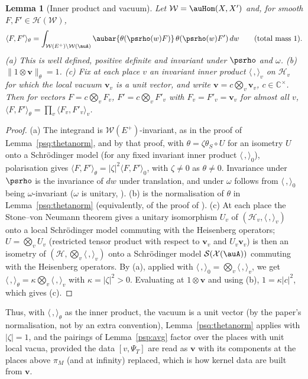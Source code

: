 \documentclass[10pt]{amsart}
\newtheorem{lemma}[theorem]{Lemma}
\theoremstyle{definition}
\theoremstyle{remark}
\newcommand{\C}{\mathbb C}
\providecommand{\psHS}{\mathcal H}
\providecommand{\psvac}{\mathbf v}
\begin{document}
\begin{lemma}[Inner product and vacuum]\label{psq:unitvac}
Let $\mathcal W=\auHom(X,X')$ and, for smooth $F,F'\in\psHS(\mathcal W)$,
\[
\langle F,F'\rangle_\theta=\int_{\mathcal W(E^+)\backslash\mathcal W(\auA)}\aubar{\theta(\psrho(w)F)}\,
\theta(\psrho(w)F')\,dw\qquad(\text{total mass }1).
\]
\textup{(a)} This is well defined, positive definite and invariant under $\psrho$ and $\omega$.
\textup{(b)} $\|1\otimes\psvac\|_\theta=1$. \textup{(c)} Fix at each place $v$ an invariant inner
product $\langle\,,\rangle_v$ on $\psHS_v$ for which the local vacuum $\psvac_v$ is a unit vector, and
write $\psvac=c\bigotimes_v\psvac_v$, $c\in\C^\times$. Then for vectors $F=c\bigotimes_vF_v$,
$F'=c\bigotimes_vF'_v$ with $F_v=F'_v=\psvac_v$ for almost all $v$,
$\langle F,F'\rangle_\theta=\prod_v\langle F_v,F'_v\rangle_v$.
\end{lemma}
\begin{proof}
(a) The integrand is $\mathcal W(E^+)$-invariant, as in the proof of Lemma~\ref{psq:thetanorm}, and by
that proof, with $\theta=\zeta\theta_S\circ U$ for an isometry $U$ onto a Schr\"odinger model (for any
fixed invariant inner product $\langle\,,\rangle_0$), polarisation gives $\langle F,F'\rangle_\theta=
|\zeta|^2\langle F,F'\rangle_0$, with $\zeta\ne0$ as $\theta\ne0$. Invariance under $\psrho$ is the
invariance of $dw$ under translation, and under $\omega$ follows from $\langle\,,\rangle_0$ being
$\omega$-invariant ($\omega$ is unitary, {\cite[Lemma~5.2]{P49}}). (b) is the normalisation of $\theta$ in Lemma~\ref{psq:thetanorm} (equivalently, of the proof of
{\cite[Proposition~5.27(ii)]{P49}}). (c) At each place the Stone--von Neumann theorem gives a unitary
isomorphism $U_v$ of $(\psHS_v,\langle\,,\rangle_v)$ onto a local Schr\"odinger model commuting with
the Heisenberg operators; $U=\bigotimes_vU_v$ (restricted tensor product with respect to $\psvac_v$ and
$U_v\psvac_v$) is then an isometry of $(\psHS,\bigotimes_v\langle\,,\rangle_v)$ onto a Schr\"odinger
model $\mathcal S(\mathcal X(\auA))$ commuting with the Heisenberg operators. By (a), applied with
$\langle\,,\rangle_0=\bigotimes_v\langle\,,\rangle_v$, we get $\langle\,,\rangle_\theta=\kappa\bigotimes_v
\langle\,,\rangle_v$ with $\kappa=|\zeta|^2>0$. Evaluating at $1\otimes\psvac$ and using (b), $1=\kappa|c|^2$, which gives (c).
\end{proof}

\noindent Thus, with $\langle\,,\rangle_\theta$ as the inner product, the vacuum is a unit vector (by
the paper's normalisation, not by an extra convention), Lemma~\ref{psq:thetanorm} applies with
$|\zeta|=1$, and the pairings of Lemma~\ref{psp:avg} factor over the places with unit local vacua,
provided the data $[v,\Psi_T]$ are read as $\psvac$ with its components at the places above $\pi_M$
(and at infinity) replaced, which is how kernel data are built from $\psvac$.
\end{document}
